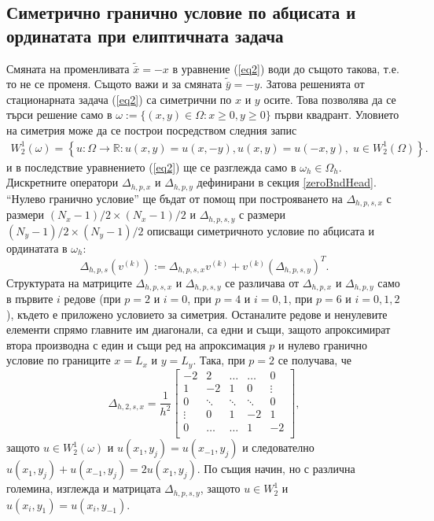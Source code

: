 \documentclass{article}
\newcommand{\be}{\begin{equation}}
\newcommand{\ee}{\end{equation}}
\newcommand{\rf}[1]{(\ref{#1})}
\newcommand{\RR}{\mathbb{R}}
\theoremstyle{remark}
\begin{document}
\subsection{Симетрично гранично условие по абцисата и ординатата при елиптичната задача}\label{symBndHead}
Смяната на променливата $\tilde {\bar x } = -x$ в уравнение \rf{eq2} води до същото такова, т.е. то не се променя. Същото важи и за смяната $\tilde {\bar y } = -y$. Затова решенията от стационарната задача \rf{eq2} са симетрични по $x$ и $y$ осите. Това позволява да се търси решение само в $\omega := \{ (x,y) \in \Omega : x \geq 0, y \geq 0 \}$ първи квадрант. Уловието на симетрия може да се построи посредством следния запис
\begin{align}\label{funSpaceSym}
W^1_2(\omega) =\left\{ u : \Omega \rightarrow \RR  : u(x,y) = u(x,-y), u(x,y) = u(-x,y), \; u \in W^1_2(\Omega) \right\}.
\end{align}
и в последствие уравнението \rf{eq2} ще се разглежда само в $\omega_h \in \Omega_h$. Дискретните оператори $\Delta_{h,p,x}$ и $\Delta_{h,p,y}$ дефинирани в секция \ref{zeroBndHead}. ``Нулево гранично условие''  ще бъдат от помощ при построяването на $\Delta_{h,p,s,x}$ с размери $(N_x-1)/2 \times (N_x-1)/2$ и $\Delta_{h,p,s,y}$ с размери $(N_y-1)/2\times(N_y-1)/2$ описващи симетричното условие по абцисата и ординатата в $\omega_h$:
\be\label{PsnDiscretSym}
\Delta_{h,p,s}(v^{(k)}) := \Delta_{h,p,s,x}  v^{(k)} + v^{(k)} (\Delta_{h,p,s,y})^T.
\ee
Структурата на матриците $\Delta_{h,p,s,x}$ и $\Delta_{h,p,s,y}$ се различава от $\Delta_{h,p,x}$ и $\Delta_{h,p,y}$ само в първите $i$ редове (при $p=2$ и $i=0$, при $p=4$ и $i=0,1$, при $p=6$ и $i=0,1,2$), където е приложено условието за симетрия. Останалите редове и ненулевите елементи спрямо главните им диагонали, са едни и същи, защото апроксимират втора производна с един и същи ред на апроксимация $p$ и нулево гранично условие по границите $x=L_x$ и $y=L_y$. Така, при $p=2$ се получава, че 
\[
\Delta_{h,2,s,x} = \frac{1}{h^2}
\begin{bmatrix}
    -2	       & 2        &     \dots   &   \dots        & 0   \\
    1               & -2            &   1           &   0               & \vdots    \\
        0           & \ddots        &    \ddots    &   \ddots       &  0 \\ 
    \vdots       &     0            &  1     	& -2    	   & 1 \\
    0               & \dots          &  \dots         & 1  	   & -2 \\
\end{bmatrix}
,
\]
защото $u \in W^1_2(\omega)$ и $u(x_1, y_j) = u(x_{-1}, y_j)$ и следователно $u(x_1, y_j) + u(x_{-1}, y_j) = 2 u(x_1, y_j)$. По същия начин, но с различна големина, изглежда и матрицата $\Delta_{h,p,s,y}$, защото $u \in W^1_2$ и $u(x_i, y_1) = u(x_i, y_{-1})$.  
\end{document}
